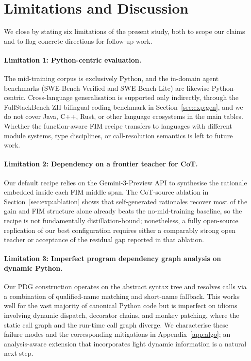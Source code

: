 \section{Limitations and Discussion}
\label{sec:limitations}

We close by stating six limitations of the present study, both to scope
our claims and to flag concrete directions for follow-up work.

\paragraph{Limitation 1: Python-centric evaluation.}
The mid-training corpus is exclusively Python, and the in-domain agent
benchmarks (SWE-Bench-Verified and SWE-Bench-Lite) are likewise
Python-centric. Cross-language generalisation is supported only
indirectly, through the FullStackBench-ZH bilingual coding benchmark in
Section~\ref{sec:exp:gen}, and we do not cover Java, C++, Rust, or other
language ecosystems in the main tables. Whether the function-aware FIM
recipe transfers to languages with different module systems, type
disciplines, or call-resolution semantics is left to future work.

\paragraph{Limitation 2: Dependency on a frontier teacher for CoT.}
Our default recipe relies on the Gemini-3-Preview API to synthesise the
rationale embedded inside each FIM middle span. The CoT-source ablation
in Section~\ref{sec:exp:ablation} shows that self-generated rationales
recover most of the gain and FIM structure alone already beats the
no-mid-training baseline, so the recipe is not fundamentally
distillation-bound; nonetheless, a fully open-source replication of our
best configuration requires either a comparably strong open teacher or
acceptance of the residual gap reported in that ablation.

\paragraph{Limitation 3: Imperfect program dependency graph analysis on dynamic Python.}
Our PDG construction operates on the abstract syntax tree and resolves
calls via a combination of qualified-name matching and short-name
fallback. This works well for the vast majority of canonical Python code
but is imperfect on idioms involving dynamic dispatch, decorator chains,
and monkey patching, where the static call graph and the run-time call
graph diverge. We characterise these failure modes and the corresponding
mitigations in Appendix~\ref{app:algo}; an analysis-aware extension that
incorporates light dynamic information is a natural next step.

